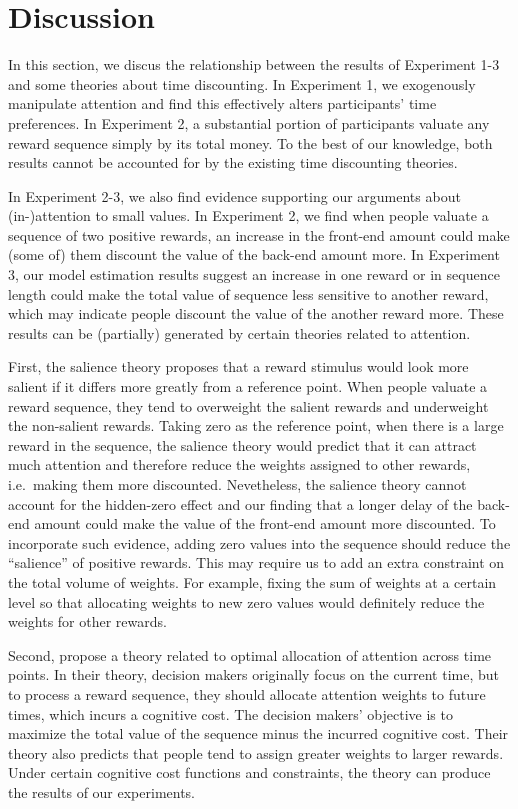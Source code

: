 \documentclass[
  12pt,
]{article}
\begin{document}
\hypertarget{discussion}{%
\section{Discussion}\label{discussion}}

In this section, we discus the relationship between the results of
Experiment 1-3 and some theories about time discounting. In Experiment
1, we exogenously manipulate attention and find this effectively alters
participants' time preferences. In Experiment 2, a substantial portion
of participants valuate any reward sequence simply by its total money.
To the best of our knowledge, both results cannot be accounted for by
the existing time discounting theories.

In Experiment 2-3, we also find evidence supporting our arguments about
(in-)attention to small values. In Experiment 2, we find when people
valuate a sequence of two positive rewards, an increase in the front-end
amount could make (some of) them discount the value of the back-end
amount more. In Experiment 3, our model estimation results suggest an
increase in one reward or in sequence length could make the total value
of sequence less sensitive to another reward, which may indicate people
discount the value of the another reward more. These results can be
(partially) generated by certain theories related to attention.

First, the salience theory
\citep{bordalo2012salience, bordalo2013salience} proposes that a reward
stimulus would look more salient if it differs more greatly from a
reference point. When people valuate a reward sequence, they tend to
overweight the salient rewards and underweight the non-salient rewards.
Taking zero as the reference point, when there is a large reward in the
sequence, the salience theory would predict that it can attract much
attention and therefore reduce the weights assigned to other rewards,
i.e.~making them more discounted. Nevetheless, the salience theory
cannot account for the hidden-zero effect and our finding that a longer
delay of the back-end amount could make the value of the front-end
amount more discounted. To incorporate such evidence, adding zero values
into the sequence should reduce the ``salience'' of positive rewards.
This may require us to add an extra constraint on the total volume of
weights. For example, fixing the sum of weights at a certain level so
that allocating weights to new zero values would definitely reduce the
weights for other rewards.

Second, \citet{noor2022optimal,noor2024constrained} propose a theory
related to optimal allocation of attention across time points. In their
theory, decision makers originally focus on the current time, but to
process a reward sequence, they should allocate attention weights to
future times, which incurs a cognitive cost. The decision makers'
objective is to maximize the total value of the sequence minus the
incurred cognitive cost. Their theory also predicts that people tend to
assign greater weights to larger rewards. Under certain cognitive cost
functions and constraints, the theory can produce the results of our
experiments.
\end{document}
